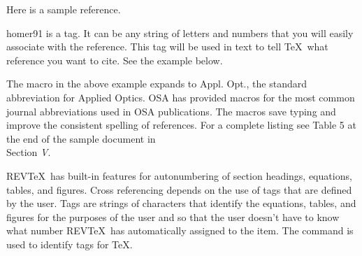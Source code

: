      Here is a sample reference.\\


     {homer91} is a tag.  It can be any string of letters and
numbers that you will easily associate with the reference.  This
tag will be used in text to tell \TeX\ what reference you want to
cite.  See the example below.\\


     The macro  in the above example expands to Appl. Opt.,
the standard abbreviation for Applied Optics.  OSA has provided
macros for the most common journal abbreviations used in OSA
publications.   The macros save typing and improve the consistent
spelling of references.   For a complete listing see Table 5 at
the end of the sample document in \\ Section {\it V}.


     REV\TeX\ has built-in features for autonumbering of section
headings, equations, tables, and figures.  Cross referencing
depends on the use of tags that are defined by the user.  Tags
are strings of characters that identify the equations, tables,
and figures for the purposes of the user and so that the user
doesn't have to know what number REV\TeX\ has automatically
assigned to the item.  The  command is used to identify
tags for \TeX.                      \\

